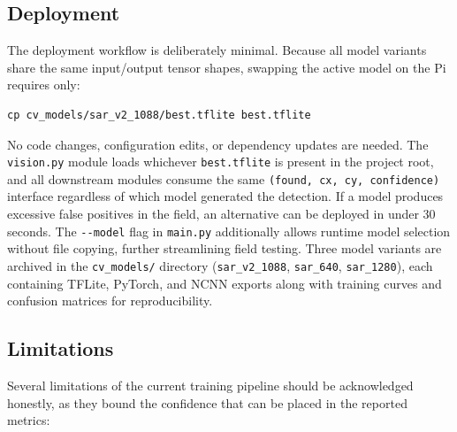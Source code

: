 \subsection{Deployment}\label{sec:training:deployment}

The deployment workflow is deliberately minimal. Because all model variants share the same input/output tensor shapes, swapping the active model on the Pi requires only:

\begin{verbatim}
cp cv_models/sar_v2_1088/best.tflite best.tflite
\end{verbatim}

No code changes, configuration edits, or dependency updates are needed. The \texttt{vision.py} module loads whichever \texttt{best.tflite} is present in the project root, and all downstream modules consume the same \texttt{(found, cx, cy, confidence)} interface regardless of which model generated the detection. If a model produces excessive false positives in the field, an alternative can be deployed in under 30 seconds. The \texttt{-{}-model} flag in \texttt{main.py} additionally allows runtime model selection without file copying, further streamlining field testing. Three model variants are archived in the \texttt{cv\_models/} directory (\texttt{sar\_v2\_1088}, \texttt{sar\_640}, \texttt{sar\_1280}), each containing TFLite, PyTorch, and NCNN exports along with training curves and confusion matrices for reproducibility.

\subsection{Limitations}\label{sec:training:limitations}

Several limitations of the current training pipeline should be acknowledged honestly, as they bound the confidence that can be placed in the reported metrics:

